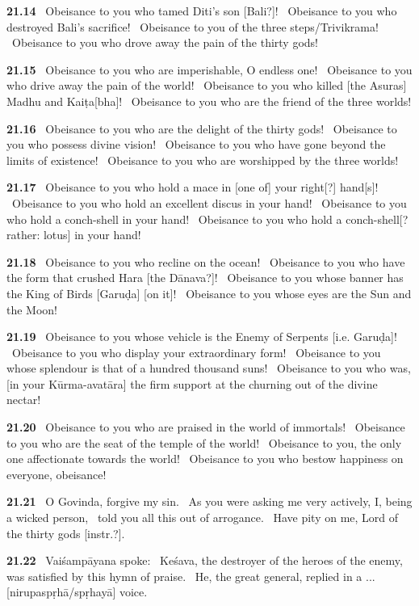 \documentclass{article}
\begin{document}
\textbf{21.14}%
\ Obeisance to you who tamed Diti's son [Bali?]!%
\ Obeisance to you who destroyed Bali's sacrifice!%
\ Obeisance to you of the three steps/Trivikrama!%
\ Obeisance to you who drove away the pain of the thirty gods!%


\textbf{21.15}%
\ Obeisance to you who are imperishable, O endless one!%
\ Obeisance to you who drive away the pain of the world!%
\ Obeisance to you who killed [the Asuras] Madhu and Kaiṭa[bha]!%
\ Obeisance to you who are the friend of the three worlds!%


\textbf{21.16}%
\ Obeisance to you who are the delight of the thirty gods!%
\ Obeisance to you who possess divine vision!%
\ Obeisance to you who have gone beyond the limits of existence!%
\ Obeisance to you who are worshipped by the three worlds!%


\textbf{21.17}%
\ Obeisance to you who hold a mace in [one of] your right[?] hand[s]!%
\ Obeisance to you who hold an excellent discus in your hand!%
\ Obeisance to you who hold a conch-shell in your hand!%
\ Obeisance to you who hold a conch-shell[? rather: lotus] in your hand!%


\textbf{21.18}%
\ Obeisance to you who recline on the ocean!%
\ Obeisance to you who have the form that crushed Hara [the Dānava?]!%
\ Obeisance to you whose banner has the King of Birds [Garuḍa] [on it]!%
\ Obeisance to you whose eyes are the Sun and the Moon!%


\textbf{21.19}%
\ Obeisance to you whose vehicle is the Enemy of Serpents [i.e. Garuḍa]!%
\ Obeisance to you who display your extraordinary form!%
\ Obeisance to you whose splendour is that of a hundred thousand suns!%
\ Obeisance to you who was, [in your Kūrma-avatāra] the firm support at the churning out of the divine nectar!%


\textbf{21.20}%
\ Obeisance to you who are praised in the world of immortals!%
\ Obeisance to you who are the seat of the temple of the world!%
\ Obeisance to you, the only one affectionate towards the world!%
\ Obeisance to you who bestow happiness on everyone, obeisance!%


\textbf{21.21}%
\ O Govinda, forgive my sin.%
\ As you were asking me very actively, I, being a wicked person,%
\ told you all this out of arrogance.%
\ Have pity on me, Lord of the thirty gods [instr.?].%


\textbf{21.22}%
\ Vaiśampāyana spoke:%
\ Keśava, the destroyer of the heroes of the enemy, was satisfied by this hymn of praise.%
\ He, the great general, replied in a ... [nirupaspṛhā/spṛhayā] voice.%
\end{document}
